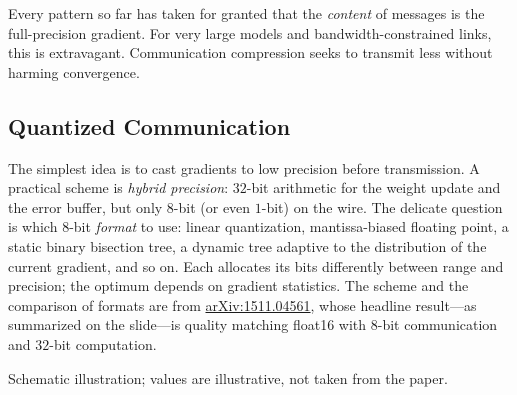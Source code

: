 \documentclass[11pt,a4paper]{article}
\theoremstyle{definition}
\theoremstyle{remark}
\theoremstyle{plain}
\begin{document}
Every pattern so far has taken for granted that the \emph{content} of
messages is the full-precision gradient. For very large models and
bandwidth-constrained links, this is extravagant. Communication
compression seeks to transmit less without harming convergence.

\subsection{Quantized Communication}

The simplest idea is to cast gradients to low precision before
transmission. A practical scheme is \emph{hybrid precision}: $32$-bit
arithmetic for the weight update and the error buffer, but only $8$-bit
(or even $1$-bit) on the wire. The delicate question is which $8$-bit
\emph{format} to use: linear quantization, mantissa-biased floating point,
a static binary bisection tree, a dynamic tree adaptive to the
distribution of the current gradient, and so on. Each allocates its bits
differently between range and precision; the optimum depends on gradient
statistics. The scheme and the comparison of formats are from
\href{https://arxiv.org/abs/1511.04561}{arXiv:1511.04561}, whose headline
result---as summarized on the slide---is quality matching float16 with
$8$-bit communication and $32$-bit computation.

\begin{center}
\par\smallskip
{\small Schematic illustration; values are illustrative, not taken from the
paper.}
\end{center}
\end{document}

